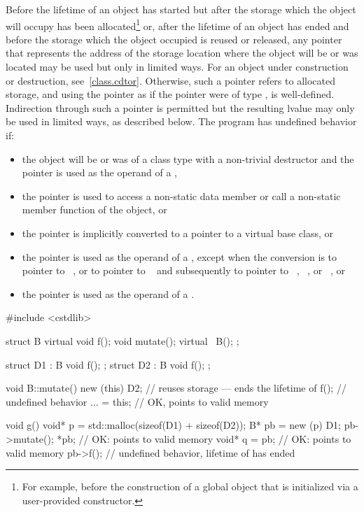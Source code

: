 \pnum
Before the lifetime of an object has started but after the storage which
the object will occupy has been allocated\footnote{For example, before the
construction of a global object
that is initialized via a user-provided constructor.}
or, after the lifetime of an object has ended and before the storage
which the object occupied is reused or released, any pointer that represents the address of
the storage location where the object will be or was located may be
used but only in limited ways.
For an object under construction or destruction, see~\ref{class.cdtor}.
Otherwise, such
a pointer refers to allocated
storage, and using the pointer as
if the pointer were of type , is
well-defined. Indirection through such a pointer is permitted but the resulting lvalue may only be used in
limited ways, as described below. The
program has undefined behavior if:
\begin{itemize}
\item
  the object will be or was of a class type with a non-trivial destructor
  and the pointer is used as the operand of a ,
\item
  the pointer is used to access a non-static data member or call a
  non-static member function of the object, or
\item
  the pointer is implicitly converted to a pointer
  to a virtual base class, or
\item
  the pointer is used as the operand of a
  , except when the conversion
  is to pointer to \cv{}~, or to pointer to \cv{}~
  and subsequently to pointer to
  \cv{}~,
  \cv{}~, or
  \cv{}~, or
\item
  the pointer is used as the operand of a
  .
\end{itemize}
\begin{example}
\begin{codeblock}
#include <cstdlib>

struct B {
  virtual void f();
  void mutate();
  virtual ~B();
};

struct D1 : B { void f(); };
struct D2 : B { void f(); };

void B::mutate() {
  new (this) D2;    // reuses storage --- ends the lifetime of 
  f();              // undefined behavior
  ... = this;       // OK,  points to valid memory
}

void g() {
  void* p = std::malloc(sizeof(D1) + sizeof(D2));
  B* pb = new (p) D1;
  pb->mutate();
  *pb;              // OK:  points to valid memory
  void* q = pb;     // OK:  points to valid memory
  pb->f();          // undefined behavior, lifetime of  has ended
}
\end{codeblock}
\end{example}

